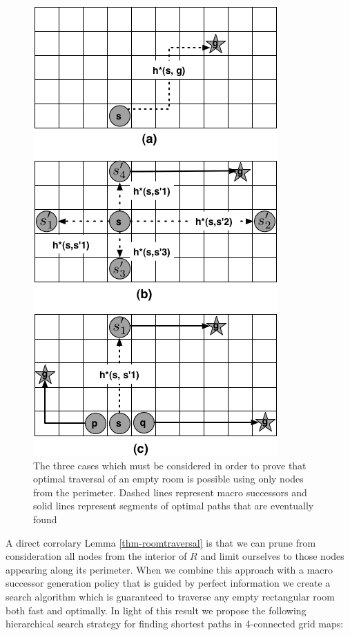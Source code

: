 \begin{figure}[htbp]
	\label{fig-roomtraversal}
	\vspace{-4pt}
       \begin{center}
           \includegraphics[scale=0.50, trim = 10mm 10mm 10mm 0mm]{diagrams/roomtraversal.png}
       \end{center}
	\vspace{-3pt}
       \caption{The three cases which must be considered in order to prove that 
			optimal traversal of an empty room is possible using only nodes from the perimeter.
			Dashed lines represent macro successors and solid lines represent segments of optimal
			paths that are eventually found}
       \label{fig-ohacontrast}
	\vspace{-15pt}
\end{figure}

A direct corrolary Lemma \ref{thm-roomtraversal} is that we can prune from consideration
all nodes from the interior of $R$ and limit ourselves to those nodes appearing along its perimeter.
When we combine this approach with a macro successor generation policy
that is guided by perfect information we create a search algorithm which is guaranteed to traverse
any empty rectangular room both fast and optimally.
In light of this result we propose the following hierarchical search strategy for finding shortest 
paths in 4-connected grid maps:

